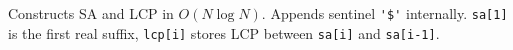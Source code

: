 
Constructs SA and LCP in $O(N \log N)$. Appends sentinel \lstinline|'$'| internally. \lstinline|sa[1]| is the first real suffix, \lstinline|lcp[i]| stores LCP between \lstinline|sa[i]| and \lstinline|sa[i-1]|.


